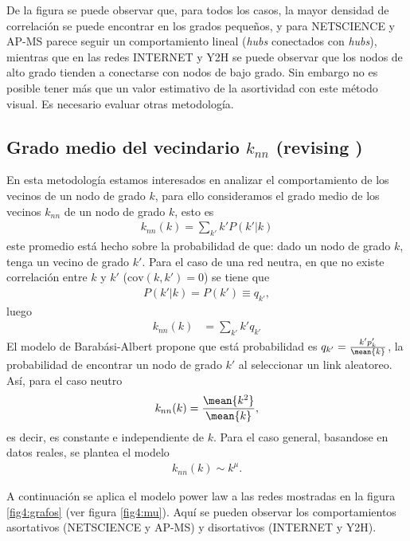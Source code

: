 De la figura se puede observar que, para todos los casos, la mayor densidad de correlaci\'on se puede encontrar en los 
grados peque\~nos, y para NETSCIENCE y AP-MS parece seguir un comportamiento lineal (\textit{hubs} conectados 
con \textit{hubs}), mientras que en las redes INTERNET y Y2H se puede observar que los nodos de alto grado tienden a 
conectarse con nodos de bajo grado. Sin embargo no es posible tener m\'as que un valor estimativo de la asortividad
con este m\'etodo visual. Es necesario evaluar otras metodolog\'ia.



\subsection{Grado medio del vecindario $k_{nn}$ (revising \citet{barabasi})}
En esta metodolog\'ia estamos interesados en analizar el comportamiento de los vecinos de un nodo de grado $k$, para
ello consideramos el grado medio de los vecinos $k_{nn}$ de un nodo de grado $k$, esto es
\begin{align*}
    k_{nn}(k) = \sum_{k'} k' P(k'|k)
\end{align*}
este promedio est\'a hecho sobre la probabilidad de que: dado un nodo de grado $k$, tenga un vecino de grado $k'$.
Para el caso de una red neutra, en que no existe correlaci\'on entre $k$ y $k'$ ($\text{cov}\left(k,k'\right)=0$) se tiene que
\begin{align*}
    P(k'|k) = P(k') \equiv q_{k'},
\end{align*}
luego 
\begin{align*}
    k_{nn}(k) &= \sum_{k'} k' q_{k'}
\end{align*}
El modelo de Barab\'asi-Albert propone que est\'a probabilidad es $q_{k'} = \frac{k' p_k'}{\mean{k}}$, la probabilidad de 
encontrar un nodo de grado $k'$ al seleccionar un link aleatoreo. As\'i, para el caso neutro
\begin{align*}
    k_{nn}(k) = \frac{\mean{k^2}}{\mean{k}},
\end{align*}
es decir, es constante e independiente de $k$.
Para el caso general, basandose en datos reales, se plantea el modelo 
\begin{align}
    k_{nn}(k) \sim k^\mu.
    \label{knn}
\end{align}

A continuaci\'on se aplica el modelo power law a las redes mostradas en la figura \ref{fig4:grafos} (ver figura \ref{fig4:mu}).
 Aqu\'i se pueden observar los comportamientos asortativos (NETSCIENCE y AP-MS) y disortativos (INTERNET y Y2H).

